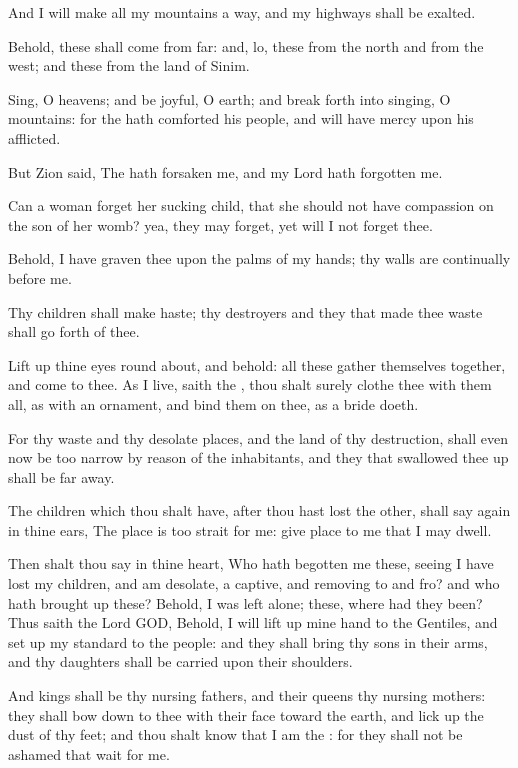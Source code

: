 \Verse And I will make all my mountains a way, and my highways shall be exalted.

\Verse Behold, these shall come from far: and, lo, these from the north and from the west; and these from the land of Sinim.

\Verse Sing, O heavens; and be joyful, O earth; and break forth into singing, O mountains: for the \LORD hath comforted his people, and will have mercy upon his afflicted.

\Verse But Zion said, The \LORD hath forsaken me, and my Lord hath forgotten me.

\Verse Can a woman forget her sucking child, that she should not have compassion on the son of her womb? yea, they may forget, yet will I not forget thee.

\Verse Behold, I have graven thee upon the palms of my hands; thy walls are continually before me.

\Verse Thy children shall make haste; thy destroyers and they that made thee waste shall go forth of thee.

\Verse Lift up thine eyes round about, and behold: all these gather themselves together, and come to thee. As I live, saith the \LORD, thou shalt surely clothe thee with them all, as with an ornament, and bind them on thee, as a bride doeth.

\Verse For thy waste and thy desolate places, and the land of thy destruction, shall even now be too narrow by reason of the inhabitants, and they that swallowed thee up shall be far away.

\Verse The children which thou shalt have, after thou hast lost the other, shall say again in thine ears, The place is too strait for me: give place to me that I may dwell.

\Verse Then shalt thou say in thine heart, Who hath begotten me these, seeing I have lost my children, and am desolate, a captive, and removing to and fro? and who hath brought up these? Behold, I was left alone; these, where had they been?  \Verse Thus saith the Lord GOD, Behold, I will lift up mine hand to the Gentiles, and set up my standard to the people: and they shall bring thy sons in their arms, and thy daughters shall be carried upon their shoulders.

\Verse And kings shall be thy nursing fathers, and their queens thy nursing mothers: they shall bow down to thee with their face toward the earth, and lick up the dust of thy feet; and thou shalt know that I am the \LORD: for they shall not be ashamed that wait for me.


